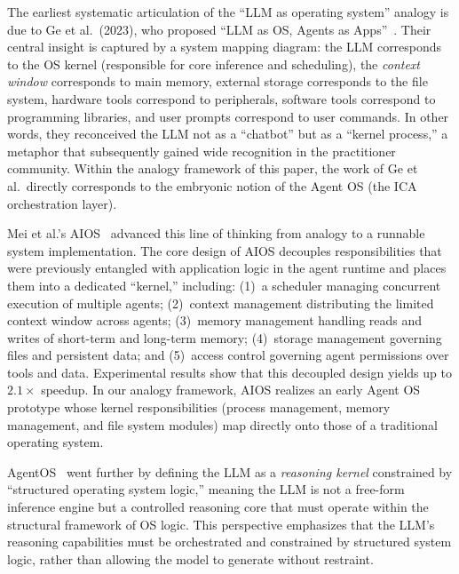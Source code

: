 The earliest systematic articulation of the ``LLM as operating system'' analogy is due to Ge et al.\ (2023), who proposed ``LLM as OS, Agents as Apps''~\cite{ge2023llmos}.
Their central insight is captured by a system mapping diagram: the LLM corresponds to the OS kernel (responsible for core inference and scheduling), the \textit{context window} corresponds to main memory, external storage corresponds to the file system, hardware tools correspond to peripherals, software tools correspond to programming libraries, and user prompts correspond to user commands.
In other words, they reconceived the LLM not as a ``chatbot'' but as a ``kernel process,'' a metaphor that subsequently gained wide recognition in the practitioner community.
Within the analogy framework of this paper, the work of Ge et al.\ directly corresponds to the embryonic notion of the Agent OS (the ICA orchestration layer).

Mei et al.'s AIOS~\cite{mei2024aios} advanced this line of thinking from analogy to a runnable system implementation.
The core design of AIOS decouples responsibilities that were previously entangled with application logic in the agent runtime and places them into a dedicated ``kernel,'' including:
(1)~a scheduler managing concurrent execution of multiple agents;
(2)~context management distributing the limited context window across agents;
(3)~memory management handling reads and writes of short-term and long-term memory;
(4)~storage management governing files and persistent data; and
(5)~access control governing agent permissions over tools and data.
Experimental results show that this decoupled design yields up to $2.1\times$ speedup.
In our analogy framework, AIOS realizes an early Agent OS prototype whose kernel responsibilities (process management, memory management, and file system modules) map directly onto those of a traditional operating system.

AgentOS~\cite{agentos2025} went further by defining the LLM as a \textit{reasoning kernel} constrained by ``structured operating system logic,'' meaning the LLM is not a free-form inference engine but a controlled reasoning core that must operate within the structural framework of OS logic.
This perspective emphasizes that the LLM's reasoning capabilities must be orchestrated and constrained by structured system logic, rather than allowing the model to generate without restraint.

